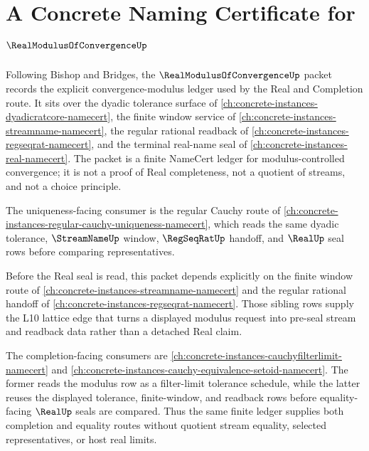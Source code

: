 \chapter{A Concrete Naming Certificate for $\RealModulusOfConvergenceUp$}
\label{ch:concrete-instances-real-modulus-of-convergence-namecert}

Following Bishop and Bridges, the $\RealModulusOfConvergenceUp$ packet records the explicit convergence-modulus ledger used by the Real and Completion route. It sits over the dyadic tolerance surface of \autoref{ch:concrete-instances-dyadicratcore-namecert}, the finite window service of \autoref{ch:concrete-instances-streamname-namecert}, the regular rational readback of \autoref{ch:concrete-instances-regseqrat-namecert}, and the terminal real-name seal of \autoref{ch:concrete-instances-real-namecert}. The packet is a finite NameCert ledger for modulus-controlled convergence; it is not a proof of Real completeness, not a quotient of streams, and not a choice principle.

The uniqueness-facing consumer is the regular Cauchy route of \autoref{ch:concrete-instances-regular-cauchy-uniqueness-namecert}, which reads the same dyadic tolerance, $\StreamNameUp$ window, $\RegSeqRatUp$ handoff, and $\RealUp$ seal rows before comparing representatives.

Before the Real seal is read, this packet depends explicitly on the finite
window route of \autoref{ch:concrete-instances-streamname-namecert} and the
regular rational handoff of \autoref{ch:concrete-instances-regseqrat-namecert}.
Those sibling rows supply the L10 lattice edge that turns a displayed modulus
request into pre-seal stream and readback data rather than a detached Real
claim.

The completion-facing consumers are \autoref{ch:concrete-instances-cauchyfilterlimit-namecert} and \autoref{ch:concrete-instances-cauchy-equivalence-setoid-namecert}. The former reads the modulus row as a filter-limit tolerance schedule, while the latter reuses the displayed tolerance, finite-window, and readback rows before equality-facing $\RealUp$ seals are compared. Thus the same finite ledger supplies both completion and equality routes without quotient stream equality, selected representatives, or host real limits.

